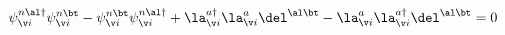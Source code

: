 \begin{equation}
\psi^{n\al \dag}_{\v i}\psi^{n\bt}_{\v i}
- \psi^{n\bt}_{\v i} \psi^{n\al \dag}_{\v i}
+\la^{a \dag}_{\v i}\la^{a}_{\v i}\del^{\al\bt}
- \la^{a}_{\v i} \la^{a \dag}_{\v i} \del^{\al\bt}=0
\end{equation}

